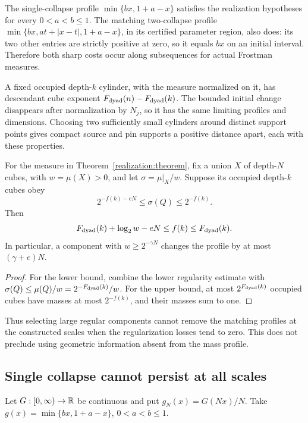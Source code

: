\begin{remark}
\label{realization:templates}
The single-collapse profile \(\min\{bx,1+a-x\}\) satisfies the realization
hypotheses for every \(0<a<b\le1\). The matching two-collapse profile
\(\min\{bx,at+|x-t|,1+a-x\}\), in its certified parameter region,
also does: its two other entries are strictly positive at zero, so it equals
\(bx\) on an initial interval. Therefore both sharp costs occur along
subsequences for actual Frostman measures.

A fixed occupied depth-\(k\) cylinder, with the measure normalized on it,
has descendant cube exponent \(F_{\rm dyad}(n)-F_{\rm dyad}(k)\).
The bounded initial change disappears after normalization by \(N_j\), so
it has the same limiting profiles and dimensions. Choosing two sufficiently
small cylinders around distinct support points gives compact source and pin
supports a positive distance apart, each with these properties.
\end{remark}

\begin{lemma}
\label{realization:regularization}
For the measure in Theorem~\ref{realization:theorem}, fix a union \(X\)
of depth-\(N\) cubes, with \(w=\mu(X)>0\), and let
\(\sigma=\mu|_X/w\). Suppose its occupied depth-\(k\) cubes obey
\[
 2^{-f(k)-eN}\le\sigma(Q)\le2^{-f(k)}.
\]
Then
\begin{equation}\label{realization:sandwich}
 F_{\rm dyad}(k)+\log_2w-eN\le f(k)\le F_{\rm dyad}(k).
\end{equation}
In particular, a component with \(w\ge2^{-\gamma N}\) changes the
profile by at most \((\gamma+e)N\).
\end{lemma}
\begin{proof}
For the lower bound, combine the lower regularity estimate with
\(\sigma(Q)\le\mu(Q)/w=2^{-F_{\rm dyad}(k)}/w\).
For the upper bound, at most \(2^{F_{\rm dyad}(k)}\) occupied cubes
have masses at most \(2^{-f(k)}\), and their masses sum to one.
\end{proof}

Thus selecting large regular components cannot remove the matching profiles
at the constructed scales when the regularization losses tend to zero.
This does not preclude using geometric information absent from the mass profile.

\subsection{Single collapse cannot persist at all scales}
\label{realization:sparsity-section}
Let \(G:[0,\infty)\to\mathbb R\) be continuous and put
\(g_N(x)=G(Nx)/N\). Take
\(g(x)=\min\{bx,1+a-x\}\), \(0<a<b\le1\).


